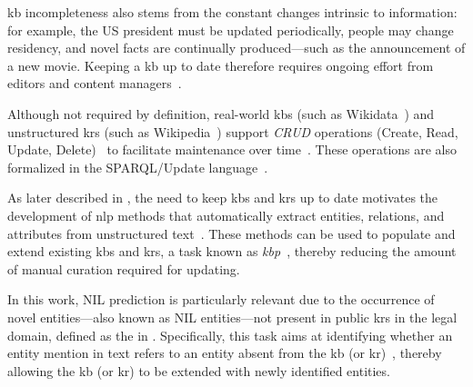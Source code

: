 \Ac{kb} incompleteness also stems from the constant changes intrinsic to information: for example, the US president must be updated periodically, people may change residency, and novel facts are continually produced---such as the announcement of a new movie. Keeping a \ac{kb} up to date therefore requires ongoing effort from editors and content managers~\cite{entityorientedsearch2018balog}.

Although not required by definition, real-world \acp{kb} (such as Wikidata~\cite{wikidata,vrandevcic2014wikidata}) and unstructured \acp{kr} (such as Wikipedia~\cite{wikipedia}) support \emph{CRUD} operations (Create, Read, Update, Delete)~\cite{elmasri2014fundamentals} to facilitate maintenance over time~\cite{shafee2023ten_rules_editing_wikidata}. These operations are also formalized in the SPARQL/Update language~\cite{seaborne2008sparqlupdate}.


As later described in , the need to keep \acp{kb} and \acp{kr} up to date motivates the development of \acl{nlp} methods that automatically extract entities, relations, and attributes from unstructured text~\cite{entityorientedsearch2018balog}. These methods can be used to populate and extend existing \acp{kb} and \acp{kr}, a task known as \emph{\acl{kbp}}~\cite{entityorientedsearch2018balog}, thereby reducing the amount of manual curation required for updating.

In this work, NIL prediction is particularly relevant due to the occurrence of novel entities---also known as NIL entities---not present in public \acp{kr} in the legal domain, defined as the \nilchallenge in . Specifically, this task aims at identifying whether an entity mention in text refers to an entity absent from the \ac{kb} (or \ac{kr})~\cite{entity_linking_with_kb_2015}, thereby allowing the \ac{kb} (or \ac{kr}) to be extended with newly identified entities.